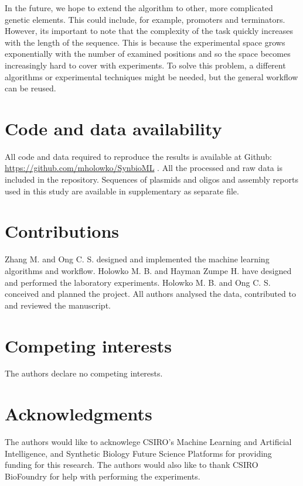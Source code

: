 \documentclass{article}
\begin{document}
In the future, we hope to extend the algorithm to other, more complicated genetic elements.
This could include, for example, promoters and terminators.
However, its important to note that the complexity of the task quickly increases with the length of the sequence.
This is because the experimental space grows exponentially with the number of examined positions and so the space becomes increasingly hard to cover with experiments.
To solve this problem, a different algorithms or experimental techniques might be needed, but the general workflow can be reused.\\



\section*{Code and data availability}

All code and data required to reproduce the results is available at Github: \url{https://github.com/mholowko/SynbioML} .
All the processed and raw data is included in the repository.
Sequences of plasmids and oligos and assembly reports used in this study are available in supplementary as separate file.

\section*{Contributions}
Zhang M. and Ong C. S. designed and implemented the machine learning algorithms and workflow. Holowko M. B. and Hayman Zumpe H. have designed and performed the laboratory experiments. Holowko M. B. and Ong C. S. conceived and planned the project. All authors analysed the data, contributed to and reviewed the manuscript.

\section*{Competing interests}
The authors declare no competing interests.

\section*{Acknowledgments}
The authors would like to acknowlege CSIRO's Machine Learning and Artificial Intelligence, and Synthetic Biology Future Science Platforms for providing funding for this research. The authors would also like to thank CSIRO BioFoundry for help with performing the experiments.


\newpage

\printbibliography

\clearpage

\setcounter{figure}{0}
\makeatletter 
\renewcommand{\thefigure}{S\@arabic\c@figure}
\makeatother
\appendix

\end{document}
